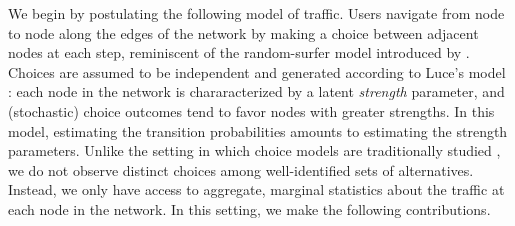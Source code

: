 We begin by postulating the following model of traffic.
Users navigate from node to node along the edges of the network by making a choice between adjacent nodes at each step, reminiscent of the random-surfer model introduced by \citet{brin1998anatomy}.
Choices are assumed to be independent and generated according to Luce's model \citep{luce1959individual}: each node in the network is chararacterized by a latent \emph{strength} parameter, and (stochastic) choice outcomes tend to favor nodes with greater strengths.
In this model, estimating the transition probabilities amounts to estimating the strength parameters.
Unlike the setting in which choice models are traditionally studied \citep{train2009discrete, maystre2015fast, vojnovic2016parameter}, we do not observe distinct choices among well-identified sets of alternatives.
Instead, we only have access to aggregate, marginal statistics about the traffic at each node in the network.
In this setting, we make the following contributions.

